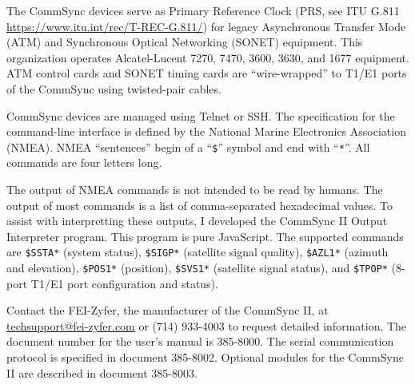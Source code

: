 \documentclass[12pt]{article}
\begin{document}
The CommSync devices serve as Primary Reference Clock (PRS, see ITU G.811 \url{https://www.itu.int/rec/T-REC-G.811/}) for legacy Asynchronous Transfer Mode (ATM) and Synchronous Optical Networking (SONET) equipment.
This organization operates Alcatel-Lucent 7270, 7470, 3600, 3630, and 1677 equipment.
ATM control cards and SONET timing cards are ``wire-wrapped'' to T1/E1 ports of the CommSync using twisted-pair cables.

CommSync devices are managed using Telnet or SSH.
The specification for the command-line interface is defined by the National Marine Electronics Association (NMEA).
NMEA ``sentences'' begin of a ``\texttt{\$}'' symbol and end with ``\texttt{*}''.
All commands are four letters long.

The output of NMEA commands is not intended to be read by humans.
The output of most commands is a list of comma-separated hexadecimal values.
To assist with interpretting these outputs, I developed the CommSync II Output Interpreter program. This program is pure JavaScript.
The supported commands are \texttt{\$SSTA*} (system status), \texttt{\$SIGP*} (satellite signal quality), \texttt{\$AZL1*} (azimuth and elevation), \texttt{\$POS1*} (position), \texttt{\$SVS1*} (satellite signal status), and \texttt{\$TPOP*} (8-port T1/E1 port configuration and status).

Contact the FEI-Zyfer, the manufacturer of the CommSync II, at \url{techsupport@fei-zyfer.com} or (714) 933-4003 to request detailed information.
The document number for the user's manual is 385-8000.
The serial communication protocol is specified in document 385-8002.
Optional modules for the CommSync II are described in document 385-8003.
\end{document}
